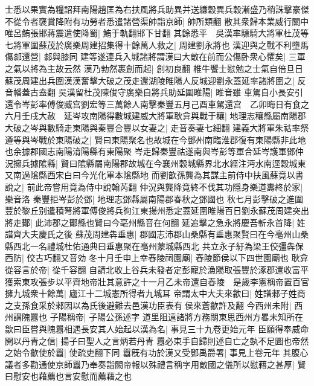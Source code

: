 士悉以果實為糧詔拜南陽趙匡為右扶風將兵助異并送縑穀異兵穀漸盛乃稍誅擊豪傑不從令者襃賞降附有功勞者悉遣諸營渠帥詣京師|{
	帥所類翻}
散其衆歸本業威行關中唯呂鮪張邯蔣震遣使降蜀|{
	鮪于軌翻邯下甘翻}
其餘悉平　吳漢率驃騎大將軍杜茂等七將軍圍蘇茂於廣樂周建招集得十餘萬人救之|{
	周建劉永將也}
漢迎與之戰不利墮馬傷䣛還營|{
	䣛與膝同}
建等遂連兵入城諸將謂漢曰大敵在前而公傷卧衆心懼矣|{
	三軍之氣以將為主故云然}
漢乃勃然裹創而起|{
	創初良翻}
椎牛饗士慰勉之士氣自倍旦日蘇茂周建出兵圍漢漢奮擊大破之茂走還湖陵睢陽人反城迎劉永蓋延率諸將圍之|{
	反音幡蓋古盍翻}
吳漢留杜茂陳俊守廣樂自將兵助延圍睢陽|{
	睢音雖}
車駕自小長安引還令岑彭率傅俊臧宫劉宏等三萬餘人南擊秦豐五月己酉車駕還宫　乙卯晦日有食之　六月壬戌大赦　延岑攻南陽得數城建威大將軍耿弇與戰于穰|{
	地理志穰縣屬南陽郡}
大破之岑與數騎走東陽與秦豐合豐以女妻之|{
	走音奏妻七細翻}
建義大將軍朱祜率祭遵等與岑戰於東陽破之|{
	賢曰東陽聚名也故城在今鄧州南臨淮郡復有東陽縣非此地也余據郡國志南陽淯陽縣有東陽聚}
岑走歸秦豐祜遂南與岑彭等軍合延岑護軍鄧仲況擁兵據隂縣|{
	賢曰隂縣屬南陽郡故城在今襄州穀城縣界北水經注沔水南逕穀城東又南過隂縣西宋白曰今光化軍本隂縣地}
而劉歆孫龔為其謀主前侍中扶風蘇竟以書說之|{
	前此帝嘗用竟為侍中說翰芮翻}
仲況與龔降竟終不伐其功隱身樂道夀終於家|{
	樂音洛}
秦豐拒岑彭於鄧|{
	地理志鄧縣屬南陽郡春秋之鄧國也}
秋七月彭擊破之進圍豐於黎丘别遣積弩將軍傅俊將兵徇江東揚州悉定蓋延圍睢陽百日劉永蘇茂周建突出將走鄼|{
	此沛郡之鄼縣也賢曰今亳州縣音在何翻}
延追擊之急永將慶吾斬永首降|{
	姓譜齊大夫慶氏之後}
蘇茂周建犇垂惠|{
	郡國志沛郡山桑縣有垂惠聚賢曰在今亳州山桑縣西北一名禮城杜佑通典曰垂惠聚在亳州蒙城縣西北}
共立永子紆為梁王佼彊犇保西防|{
	佼古巧翻又音効}
冬十月壬申上幸舂陵祠園廟|{
	舂陵節侯以下四世園廟也}
耿弇從容言於帝|{
	從千容翻}
自請北收上谷兵未發者定彭寵於漁陽取張豐於涿郡還收富平獲索東攻張步以平齊地帝壯其意許之十一月乙未帝還自舂陵　是歲李憲稱帝置百官擁九城衆十餘萬|{
	廬江十二城憲所得者九城耳}
帝謂太中大夫來歙曰|{
	姓譜郲子姓商之支孫食采於郲因以為氏後避難去邑漢功臣表有侯來蒼歙許及翻}
今西州未附|{
	西州謂隗囂也}
子陽稱帝|{
	子陽公孫述字}
道里阻遠諸將方務關東思西州方畧未知所在歙曰臣嘗與隗囂相遇長安其人始起以漢為名|{
	事見三十九卷更始元年}
臣願得奉威命開以丹青之信|{
	揚子曰聖人之言炳若丹青}
囂必束手自歸則述自亡之埶不足圖也帝然之始令歙使於囂|{
	使疏吏翻下同}
囂旣有功於漢又受鄧禹爵署|{
	事見上卷元年}
其腹心議者多勸通使京師囂乃奉奏詣闕帝報以殊禮言稱字用敵國之儀所以慰藉之甚厚|{
	賢曰慰安也藉薦也言安慰而薦藉之也}


